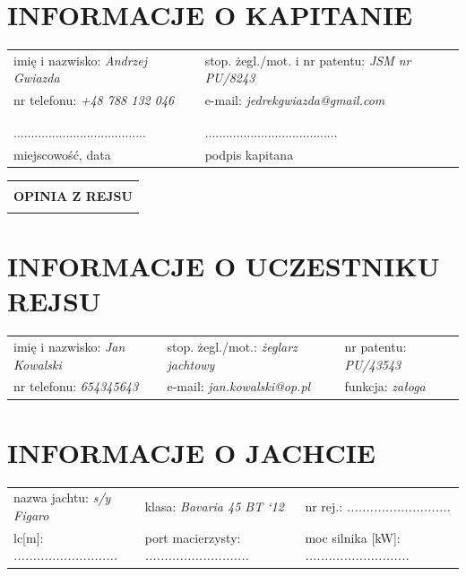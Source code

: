 \documentclass{article}
\begin{document}
\section*{INFORMACJE O KAPITANIE}

\begin{tabularx}{\textwidth}{X X}
imię i nazwisko: \textit{Andrzej Gwiazda} & stop. żegl./mot. i nr patentu: \textit{JSM nr PU/8243}\\
nr telefonu: \textit{+48 788 132 046} & e-mail: \textit{jedrekgwiazda@gmail.com}\\
\\\\
...................................... & ......................................\\
miejscowość, data & podpis kapitana\\
\end{tabularx}
\newpage
\begin{tabularx}{\textwidth} { 
  | >{\centering\arraybackslash}X | }
 \hline
 \\
 \textbf{\huge OPINIA Z REJSU} \\
 \\
\hline
\end{tabularx}

\section*{INFORMACJE O UCZESTNIKU REJSU}
\begin{tabularx}{\textwidth}{X X X}
imię i nazwisko: \textit{Jan Kowalski} & stop. żegl./mot.: \textit{żeglarz jachtowy} & nr patentu: \textit{PU/43543} \\
nr telefonu: \textit{654345643} & e-mail: \textit{jan.kowalski@op.pl} & funkcja: \textit{załoga} \\
\end{tabularx}

\section*{INFORMACJE O JACHCIE}

\begin{tabularx}{\textwidth}{X X X}
nazwa jachtu: \textit{s/y Figaro} & klasa: \textit{Bavaria 45 BT ‘12} & nr rej.: \textit{...........................} \\
lc[m]: \textit{...........................} & port macierzysty: \textit{...........................} & moc silnika [kW]: \textit{...........................} \\
\end{tabularx}
\end{document}
